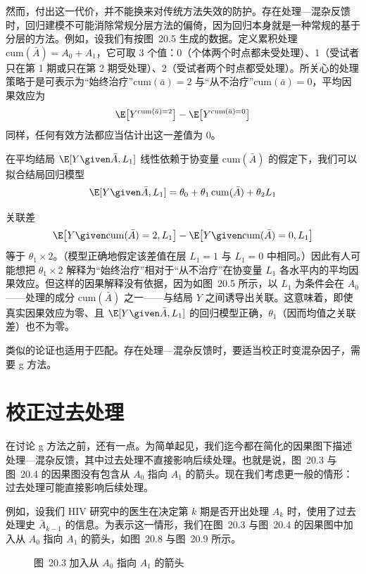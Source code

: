 然而，付出这一代价，并不能换来对传统方法失效的防护。存在处理—混杂反馈时，回归建模不可能消除常规分层方法的偏倚，因为回归本身就是一种常规的基于分层的方法。例如，设我们有按图~20.5 生成的数据。定义累积处理 $\mathrm{cum}(\bar A)=A_0+A_1$，它可取 3 个值：0（个体两个时点都未受处理）、1（受试者只在第 1 期或只在第 2 期受处理）、2（受试者两个时点都受处理）。所关心的处理策略于是可表示为“始终治疗”$\mathrm{cum}(\bar a)=2$ 与“从不治疗”$\mathrm{cum}(\bar a)=0$，平均因果效应为
\[
\E\bigl[Y^{\mathrm{cum}(\bar a)=2}\bigr]-\E\bigl[Y^{\mathrm{cum}(\bar a)=0}\bigr]
\]
同样，任何有效方法都应当估计出这一差值为 0。

在平均结局 $\E[Y\given \bar A,L_1]$ 线性依赖于协变量 $\mathrm{cum}(\bar A)$ 的假定下，我们可以拟合结局回归模型
\[
\E[Y\given \bar A,L_1]=\theta_0+\theta_1\,\mathrm{cum}(\bar A)+\theta_2L_1
\]

关联差
\[
\E\bigl[Y\given \mathrm{cum}(\bar A)=2,L_1\bigr]-\E\bigl[Y\given \mathrm{cum}(\bar A)=0,L_1\bigr]
\]
等于 $\theta_1\times 2$。（模型正确地假定该差值在层 $L_1=1$ 与 $L_1=0$ 中相同。）因此有人可能想把 $\theta_1\times 2$ 解释为“始终治疗”相对于“从不治疗”在协变量 $L_1$ 各水平内的平均因果效应。但这样的因果解释没有依据，因为如图~20.5 所示，以 $L_1$ 为条件会在 $A_0$——处理的成分 $\mathrm{cum}(\bar A)$ 之一——与结局 $Y$ 之间诱导出关联。这意味着，即使真实因果效应为零、且 $\E[Y\given \bar A,L_1]$ 的回归模型正确，$\theta_1$（因而均值之关联差）也不为零。

类似的论证也适用于匹配。存在处理—混杂反馈时，要适当校正时变混杂因子，需要 g 方法。

\section{校正过去处理}

在讨论 g 方法之前，还有一点。为简单起见，我们迄今都在简化的因果图下描述处理—混杂反馈，其中过去处理不直接影响后续处理。也就是说，图~20.3 与图~20.4 的因果图没有包含从 $A_0$ 指向 $A_1$ 的箭头。现在我们考虑更一般的情形：过去处理可能直接影响后续处理。

例如，设我们 HIV 研究中的医生在决定第 $k$ 期是否开出处理 $A_k$ 时，使用了过去处理史 $\bar A_{k-1}$ 的信息。为表示这一情形，我们在图~20.3 与图~20.4 的因果图中加入从 $A_0$ 指向 $A_1$ 的箭头，如图~20.8 与图~20.9 所示。

\begin{figure}[htbp]
\centering
{}
\caption{图~20.3 加入从 $A_0$ 指向 $A_1$ 的箭头}
\label{fig:20.8}
\end{figure}

